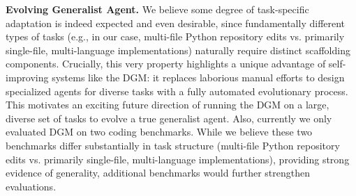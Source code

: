 \documentclass{article} %
\begin{document}
\textbf{Evolving Generalist Agent.}
We believe some degree of task-specific adaptation is indeed expected and even desirable, since fundamentally different types of tasks (e.g., in our case, multi-file Python repository edits vs. primarily single-file, multi-language implementations) naturally require distinct scaffolding components. Crucially, this very property highlights a unique advantage of self-improving systems like the DGM: it replaces laborious manual efforts to design specialized agents for diverse tasks with a fully automated evolutionary process. This motivates an exciting future direction of running the DGM on a large, diverse set of tasks to evolve a true generalist agent. Also, currently we only evaluated DGM on two coding benchmarks. While we believe these two benchmarks differ substantially in task structure (multi-file Python repository edits vs. primarily single-file, multi-language implementations), providing strong evidence of generality, additional benchmarks would further strengthen evaluations.
\end{document}
